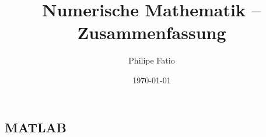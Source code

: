 \documentclass[9pt,fleqn,article,ngerman]{memoir}
\title{Numerische Mathematik -- Zusammenfassung}
\date{\today}
\author{Philipe Fatio}
\numberwithin{equation}{section}
\begin{document}
\footnotesize{
\begin{multicols*}{3}
\end{multicols*}
\appendix
\begin{multicols*}{3}
	\chapter{MATLAB}
\end{multicols*}
}
\end{document}
